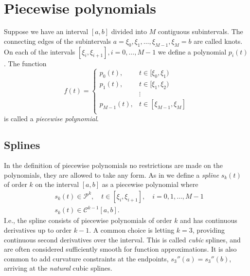 \documentclass[a4paper]{memoir}
\theoremstyle{plain}
\theoremstyle{definition}
\theoremstyle{remark}
\begin{document}
\section{Piecewise polynomials}
Suppose we have an interval $[a,b]$ divided into $M$ contiguous subintervals.
The connecting edges of the subintervals $a = \xi_0, \xi_1, \hdots, \xi_{M - 1}, \xi_{M} = b$ are called knots.
On each of the intervals $[\xi_i, \xi_{i+1}], i = 0, \hdots, M-1$ we define a polynomial $p_i (t)$.
The function
\begin{equation*}
        f(t) = 
                \begin{cases}
                        p_0(t), &  t \in [\xi_0, \xi_{1}) \\
                        p_1(t), & t \in [\xi_1, \xi_2)  \\
                        & \vdots \\
                        p_{M-1}(t), & t \in [\xi_{M-1}, \xi_{M}]  \\
                \end{cases}
\end{equation*}
is called a \textit{piecewise polynomial}.


\subsection{Splines}
In the definition of piecewise polynomials no restrictions are made on the polynomials, they are allowed to take any form.
As in \cite{quarteroni} we define a \textit{spline} $s_k(t)$ of order $k$ on the interval $[a,b]$ as a piecewise polynomial where
\begin{align*}
        &s_k(t) \in \mathcal{P}^k , \quad t \in [\xi_i, \xi_{i+1}],\quad i = 0, 1, \hdots, M-1 \\
        &s_k(t) \in \mathcal{C}^{k - 1}[a, b].
\end{align*}
I.e., the spline consists of piecewise polynomials of order $k$ and has continuous derivatives up to order $k - 1$.
A common choice is letting $k = 3$, providing continuous second derivatives over the interval.
This is called \textit{cubic} splines, and are often considered sufficiently smooth for function approximations.
It is also common to add curvature constraints at the endpoints, $s_3''(a) = s_3''(b)$, arriving at the \textit{natural} cubic splines.
\end{document}
